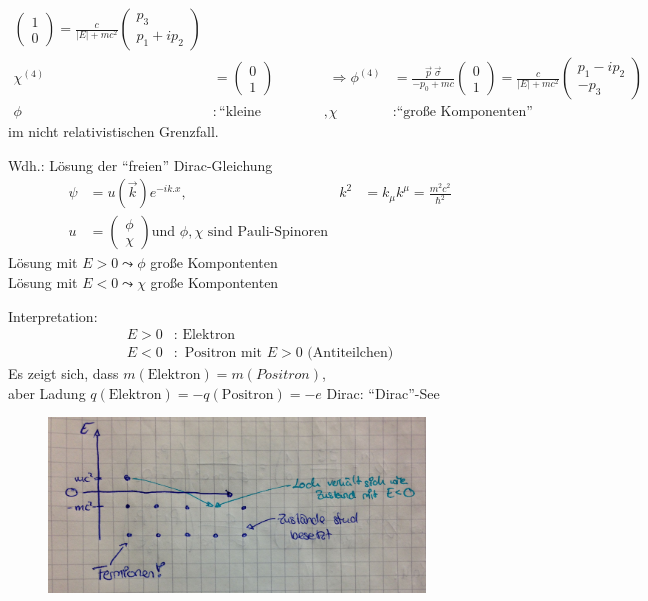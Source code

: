 \begin{enumerate}[1.]
\begin{align*}
			\begin{pmatrix}
			1 \\ 0
			\end{pmatrix}
			= \frac{c}{|E| + mc^2}
			\begin{pmatrix}
			p_3 \\ p_1 + ip_2
			\end{pmatrix} 
			\\
			\chi^{(4)} &= 
			\begin{pmatrix}
			0 \\ 1
			\end{pmatrix}
			&\Rightarrow 
			\phi^{(4)} &= \frac{\vec{p}~\vec{\sigma}}{-p_0 + mc}
			\begin{pmatrix}
			0 \\ 1
			\end{pmatrix}
			= \frac{c}{|E| + mc^2}
			\begin{pmatrix}
			p_1 - ip_2 \\ -p_3
			\end{pmatrix}
			\\
			\phi &: \text{``kleine Komponenten''} ,& \chi &: \text{``große Komponenten''}
		\end{align*}
	im nicht relativistischen Grenzfall.
	\end{enumerate}
Wdh.: Lösung 
der ``freien'' Dirac-Gleichung 
	\begin{align*}
		\psi &= u(\vec{k}) e^{-ik.x} ,&
		k^2 &= k_\mu k^\mu = \frac{m^2 c^2}{\hbar^2} \\
		u &=
		\begin{pmatrix}
		\phi \\
		\chi
		\end{pmatrix}
		\text{und } \phi, \chi \text{ sind Pauli-Spinoren}		
	\end{align*}
Lösung mit $E > 0 \leadsto \phi$ große Kompontenten 
\\
Lösung mit $E < 0 \leadsto \chi$ große Kompontenten

Interpretation:
	\begin{align*}
		E>0 &: \text{ Elektron} \\
		E<0 &: \text{ Positron mit } E>0 \text{ (Antiteilchen)}
	\end{align*}
Es zeigt sich, dass $m(\text{Elektron}) = m{(Positron)}$, 
\\aber Ladung $q(\text{Elektron}) = -q(\text{Positron}) = -e$
\newpage
Dirac: ``Dirac''-See
	\begin{figure} [h]
		\begin{center}
			\includegraphics[width=10cm]{Dirac-Gleichung1}
		\end{center}
	\end{figure}
	
